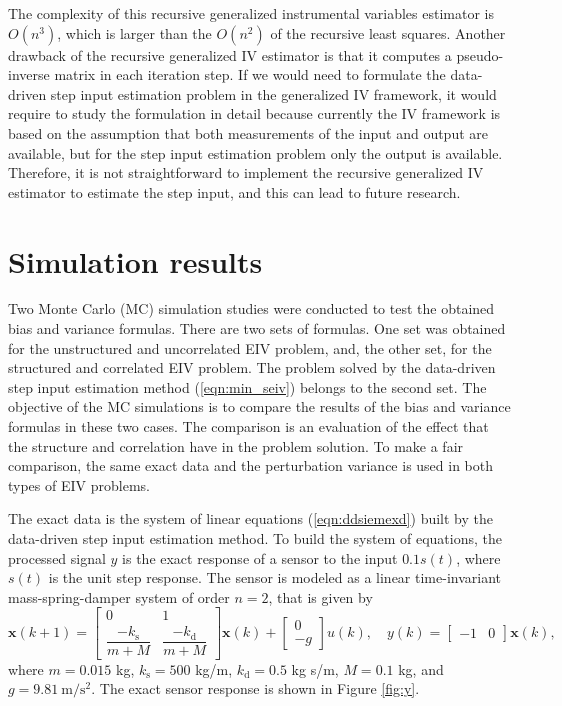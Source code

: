 The complexity of this recursive generalized instrumental variables estimator is ${O}(n^3)$, which is larger than the ${O}(n^2)$ of the recursive least squares.
Another drawback of the recursive generalized IV estimator is that it computes a pseudo-inverse matrix in each iteration step.
If we would need to formulate the data-driven step input estimation problem in the generalized IV framework, it would require to study the formulation in detail because currently the IV framework is based on the assumption that both measurements of the input and output are available, but for the step input estimation problem only the output is available.
Therefore, it is not straightforward to implement the recursive generalized IV estimator to estimate the step input, and this can lead to future research.
\color{black}

\section{Simulation results}

Two Monte Carlo (MC) simulation studies were conducted to test the obtained bias and variance formulas.
\color{blue} There are two sets of formulas.
One set was obtained for the unstructured and uncorrelated EIV problem, and, the other set, for the structured and correlated EIV problem. 
The problem solved by the data-driven step input estimation method (\ref{eqn:min_seiv}) belongs to the second set.
The objective of the MC simulations is to compare the results of the bias and variance formulas in these two cases. 
The comparison is an evaluation of the effect that the structure and correlation have in the problem solution.
To make a fair comparison, the same exact data and the perturbation variance is used in both types of EIV problems. 

The exact data is the system of linear equations (\ref{eqn:ddsiemexd}) built by the data-driven step input estimation method.
To build the system of equations, the processed signal ${y}$ is the exact response of a sensor to the input $0.1s(t)$, where $s(t)$ is the unit step response.  
The sensor is modeled as a linear time-invariant mass-spring-damper system of order $n = 2$, that is given by 
\begin{equation} 
\mathbf{x}(k+1) = \begin{bmatrix} 0 & 1 \\ \dfrac{-k_{\mathrm{s}}}{m+M} & \dfrac{-k_{\mathrm{d}}}{m+M} \end{bmatrix} \mathbf{x}(k) + \begin{bmatrix} 0\\ -g\end{bmatrix} u(k),  
\quad y(k) = \begin{bmatrix} -1 & 0 \end{bmatrix} \mathbf{x}(k), \label{eqn:msdst}
\end{equation}
where $m=0.015$ kg, $k_{\mathrm{s}}=500$ kg/m, $k_{\mathrm{d}}=0.5$ kg s/m, $M=0.1$ kg, and $g=9.81 \ \mathrm{m/s^2}$.   
The exact sensor response is shown in Figure \ref{fig:y}.

